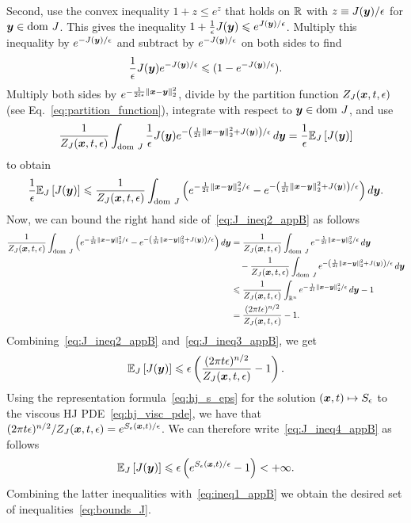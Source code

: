 Second, use the convex inequality $1+z\leqslant e^{z}$ that holds on $\mathbb{R}$ with $z \equiv J(\boldsymbol{y})/\epsilon$ for $\boldsymbol{y}\in\mathrm{dom~} J$. This gives the inequality $1 + \frac{1}{\epsilon}J(\boldsymbol{y}) \leqslant e^{J(\boldsymbol{y})/\epsilon}$. Multiply this inequality by $e^{-J(\boldsymbol{y})/\epsilon}$ and subtract by $e^{-J(\boldsymbol{y})/\epsilon}$ on both sides to find 
\begin{equation}\label{eq:J_ineq1_appB}
\frac{1}{\epsilon}J(\boldsymbol{y})e^{-J(\boldsymbol{y})/\epsilon} \leqslant (1-e^{-J(\boldsymbol{y})/\epsilon}).
\end{equation}
Multiply both sides by $e^{-\frac{1}{2t\epsilon}\left\Vert \boldsymbol{x}-\boldsymbol{y}\right\Vert _{2}^{2}}$, divide by the partition function $Z_J(\boldsymbol{x},t,\epsilon)$ (see Eq.~\eqref{eq:partition_function}), integrate with respect to $\boldsymbol{y} \in \mathrm{dom~} J$, and use
\begin{equation*}
\frac{1}{Z_J(\boldsymbol{x},t,\epsilon)}\int_{\mathrm{dom~} J} \frac{1}{\epsilon}J(\boldsymbol{y})e^{-\left(\frac{1}{2t}\left\Vert{\boldsymbol{x}-\boldsymbol{y}} \right\Vert_{2}^{2} +J(\boldsymbol{y})\right)/\epsilon} \mathop{}\!d\boldsymbol{y} = \frac{1}{\epsilon}\mathbb{E}_{J}\left [{J(\boldsymbol{y})}\right]
\end{equation*}
to obtain
\begin{equation}\label{eq:J_ineq2_appB}
\frac{1}{\epsilon}\mathbb{E}_{J}\left [{J(\boldsymbol{y})}\right] \leqslant 
\frac{1}{Z_J(\boldsymbol{x},t,\epsilon)}\int_{\mathrm{dom~} J} \left(e^{-\frac{1}{2t}\left\Vert{\boldsymbol{x}-\boldsymbol{y}} \right\Vert_{2}^{2}/\epsilon} - e^{-\left(\frac{1}{2t}\left\Vert{\boldsymbol{x}-\boldsymbol{y}} \right\Vert_{2}^{2} +J(\boldsymbol{y})\right)/\epsilon}\right) \mathop{}\!d \boldsymbol{y}.
\end{equation}
Now, we can bound the right hand side of~\eqref{eq:J_ineq2_appB} as follows
\begin{equation}\label{eq:J_ineq3_appB}
\begin{alignedat}{1}
\frac{1}{Z_J(\boldsymbol{x},t,\epsilon)}\int_{\mathrm{dom~} J} \left(e^{-\frac{1}{2t}\left\Vert{\boldsymbol{x}-\boldsymbol{y}} \right\Vert_{2}^{2}/\epsilon} - e^{-\left(\frac{1}{2t}\left\Vert{\boldsymbol{x}-\boldsymbol{y}} \right\Vert_{2}^{2} +J(\boldsymbol{y})\right)/\epsilon}\right) \mathop{}\!d \boldsymbol{y} &= \frac{1}{Z_J(\boldsymbol{x},t,\epsilon)}\int_{\mathrm{dom~} J} e^{-\frac{1}{2t}\left\Vert{\boldsymbol{x}-\boldsymbol{y}} \right\Vert_{2}^{2}/\epsilon} \mathop{}\!d \boldsymbol{y} \\
&\quad - \frac{1}{Z_J(\boldsymbol{x},t,\epsilon)}\int_{\mathrm{dom~} J} e^{-\left(\frac{1}{2t}\left\Vert{\boldsymbol{x}-\boldsymbol{y}} \right\Vert_{2}^{2} +J(\boldsymbol{y})\right)/\epsilon} \mathop{}\!d \boldsymbol{y}  \\
&\leqslant \frac{1}{Z_J(\boldsymbol{x},t,\epsilon)}\int_{\mathbb{R}^n} e^{-\frac{1}{2t}\left\Vert{\boldsymbol{x}-\boldsymbol{y}} \right\Vert_{2}^{2}/\epsilon} \mathop{}\!d \boldsymbol{y} - 1 \\
&= \frac{(2\pi t\epsilon)^{n/2}}{Z_J(\boldsymbol{x},t,\epsilon)} - 1.
\end{alignedat}
\end{equation}
Combining~\eqref{eq:J_ineq2_appB} and~\eqref{eq:J_ineq3_appB}, we get
\begin{equation}\label{eq:J_ineq4_appB}
\mathbb{E}_{J}\left [{J(\boldsymbol{y})}\right] \leqslant \epsilon\left(\frac{(2\pi t\epsilon)^{n/2}}{Z_J(\boldsymbol{x},t,\epsilon)} - 1\right).
\end{equation}
Using the representation formula~\eqref{eq:hj_s_eps} for the solution $(\boldsymbol{x},t) \mapsto S_\epsilon$ to the viscous HJ PDE~\eqref{eq:hj_visc_pde}, we have that $(2\pi t\epsilon)^{n/2}/Z_J(\boldsymbol{x},t,\epsilon) = e^{S_\epsilon(\boldsymbol{x},t)/\epsilon}$. We can therefore write~\eqref{eq:J_ineq4_appB} as follows
\[
\mathbb{E}_{J}\left [{J(\boldsymbol{y})}\right] \leqslant \epsilon\left(e^{S_\epsilon(\boldsymbol{x},t)/\epsilon} - 1\right) < +\infty.
\]
Combining the latter inequalities with~\eqref{eq:ineq1_appB} we obtain the desired set of inequalities~\eqref{eq:bounds_J}.